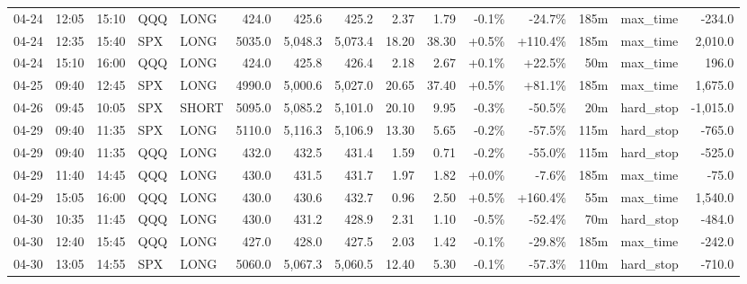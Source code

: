 \documentclass[11pt,a4paper,twoside]{article}
\begin{document}
\begin{landscape}
\begin{center}
\begin{longtable}{>{\color{txtmain}}l l l l l r r r r r r r r >{\color{txtmain}}l r}
04-24 & 12:05 & 15:10 & QQQ & LONG & 424.0 & 425.6 & 425.2 & 2.37 & 1.79 & \textcolor{lossred}{-0.1\%} & \textcolor{lossred}{-24.7\%} & 185m & max\_time & \textcolor{lossred}{-234.0} \\
04-24 & 12:35 & 15:40 & SPX & LONG & 5035.0 & 5,048.3 & 5,073.4 & 18.20 & 38.30 & \textcolor{wingreen}{+0.5\%} & \textcolor{wingreen}{+110.4\%} & 185m & max\_time & \textcolor{wingreen}{2,010.0} \\
04-24 & 15:10 & 16:00 & QQQ & LONG & 424.0 & 425.8 & 426.4 & 2.18 & 2.67 & \textcolor{wingreen}{+0.1\%} & \textcolor{wingreen}{+22.5\%} & 50m & max\_time & \textcolor{wingreen}{196.0} \\
04-25 & 09:40 & 12:45 & SPX & LONG & 4990.0 & 5,000.6 & 5,027.0 & 20.65 & 37.40 & \textcolor{wingreen}{+0.5\%} & \textcolor{wingreen}{+81.1\%} & 185m & max\_time & \textcolor{wingreen}{1,675.0} \\
04-26 & 09:45 & 10:05 & SPX & SHORT & 5095.0 & 5,085.2 & 5,101.0 & 20.10 & 9.95 & \textcolor{lossred}{-0.3\%} & \textcolor{lossred}{-50.5\%} & 20m & hard\_stop & \textcolor{lossred}{-1,015.0} \\
04-29 & 09:40 & 11:35 & SPX & LONG & 5110.0 & 5,116.3 & 5,106.9 & 13.30 & 5.65 & \textcolor{lossred}{-0.2\%} & \textcolor{lossred}{-57.5\%} & 115m & hard\_stop & \textcolor{lossred}{-765.0} \\
04-29 & 09:40 & 11:35 & QQQ & LONG & 432.0 & 432.5 & 431.4 & 1.59 & 0.71 & \textcolor{lossred}{-0.2\%} & \textcolor{lossred}{-55.0\%} & 115m & hard\_stop & \textcolor{lossred}{-525.0} \\
04-29 & 11:40 & 14:45 & QQQ & LONG & 430.0 & 431.5 & 431.7 & 1.97 & 1.82 & \textcolor{wingreen}{+0.0\%} & \textcolor{lossred}{-7.6\%} & 185m & max\_time & \textcolor{lossred}{-75.0} \\
04-29 & 15:05 & 16:00 & QQQ & LONG & 430.0 & 430.6 & 432.7 & 0.96 & 2.50 & \textcolor{wingreen}{+0.5\%} & \textcolor{wingreen}{+160.4\%} & 55m & max\_time & \textcolor{wingreen}{1,540.0} \\
04-30 & 10:35 & 11:45 & QQQ & LONG & 430.0 & 431.2 & 428.9 & 2.31 & 1.10 & \textcolor{lossred}{-0.5\%} & \textcolor{lossred}{-52.4\%} & 70m & hard\_stop & \textcolor{lossred}{-484.0} \\
04-30 & 12:40 & 15:45 & QQQ & LONG & 427.0 & 428.0 & 427.5 & 2.03 & 1.42 & \textcolor{lossred}{-0.1\%} & \textcolor{lossred}{-29.8\%} & 185m & max\_time & \textcolor{lossred}{-242.0} \\
04-30 & 13:05 & 14:55 & SPX & LONG & 5060.0 & 5,067.3 & 5,060.5 & 12.40 & 5.30 & \textcolor{lossred}{-0.1\%} & \textcolor{lossred}{-57.3\%} & 110m & hard\_stop & \textcolor{lossred}{-710.0} \\

\end{longtable}
\end{center}
\end{landscape}
\end{document}
